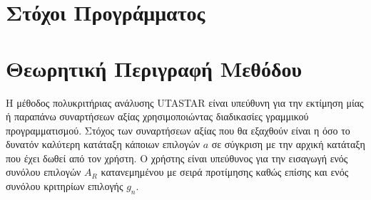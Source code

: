 \documentclass[12pt,a4paper,titlepage]{article}
\numberwithin{equation}{section}
\begin{document}
\section{Στόχοι Προγράμματος}    

\section{Θεωρητική Περιγραφή Μεθόδου}
\label{sec:2}
Η μέθοδος πολυκριτήριας ανάλυσης UTASTAR είναι υπεύθυνη για την εκτίμηση μίας ή παραπάνω συναρτήσεων αξίας χρησιμοποιώντας διαδικασίες γραμμικού προγραμματισμού. Στόχος των συναρτήσεων αξίας που θα εξαχθούν είναι η όσο το δυνατόν καλύτερη κατάταξη κάποιων επιλογών $a$ σε σύγκριση με την αρχική κατάταξη που έχει δωθεί από τον χρήστη. Ο χρήστης είναι υπεύθυνος για την εισαγωγή ενός συνόλου επιλογών $A_{R}$ κατανεμημένου με σειρά προτίμησης καθώς επίσης και ενός συνόλου κριτηρίων επιλογής $g_{n}$.
\end{document}

